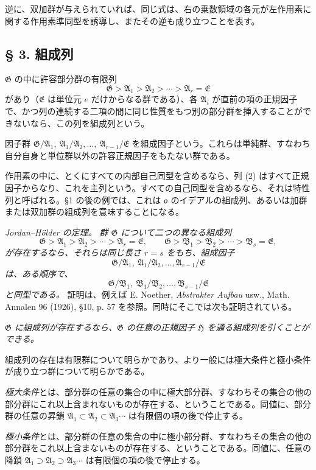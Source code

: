 \documentclass[11pt]{article}
\providecommand{\mG}{\mathfrak{G}}
\providecommand{\mA}{\mathfrak{A}}
\providecommand{\mB}{\mathfrak{B}}
\providecommand{\mE}{\mathfrak{E}}
\providecommand{\mH}{\mathfrak{H}}
\providecommand{\mo}{\mathfrak{o}}
\begin{document}
逆に、双加群が与えられていれば、同じ式は、右の乗数領域の各元が左作用素に関する作用素準同型を誘導し、またその逆も成り立つことを表す。

\subsection*{§ 3. 組成列}

$\mG$ の中に許容部分群の有限列
\[
        \mG>\mA_1>\mA_2>\cdots>\mA_r=\mE \tag{2}
\]
があり（$\mE$ は単位元 $e$ だけからなる群である）、各 $\mA_i$ が直前の項の正規因子で、かつ列の連続する二項の間に同じ性質をもつ別の部分群を挿入することができないなら、この列を組成列という。

因子群 $\mG/\mA_1,\ \mA_1/\mA_2,\ldots,\ \mA_{r-1}/\mE$ を組成因子という。これらは単純群、すなわち自分自身と単位群以外の許容正規因子をもたない群である。

作用素の中に、とくにすべての内部自己同型を含めるなら、列 (2) はすべて正規因子からなり、これを主列という。すべての自己同型を含めるなら、それは特性列と呼ばれる。§1 の後の例では、これは $\mo$ のイデアルの組成列、あるいは加群または双加群の組成列を意味することになる。

\emph{Jordan--Hölder の定理。} \emph{群 $\mG$ について二つの異なる組成列}
\[
        \mG>\mA_1>\mA_2>\cdots>\mA_r=\mE,
        \qquad
        \mG>\mB_1>\mB_2>\cdots>\mB_s=\mE,
\]
\emph{が存在するなら、それらは同じ長さ $r=s$ をもち、組成因子}
\[
        \mG/\mA_1,\ \mA_1/\mA_2,\ldots,\mA_{r-1}/\mE
\]
\emph{は、ある順序で、}
\[
        \mG/\mB_1,\ \mB_1/\mB_2,\ldots,\mB_{s-1}/\mE
\]
\emph{と同型である。}
証明は、例えば E. Noether, \emph{Abstrakter Aufbau} usw., Math. Annalen 96 (1926), §10, p. 57 を参照。同時にそこでは次も証明されている。

\emph{$\mG$ に組成列が存在するなら、$\mG$ の任意の正規因子 $\mH$ を通る組成列を引くことができる。}

組成列の存在は有限群について明らかであり、より一般には極大条件と極小条件が成り立つ群について明らかである。

\emph{極大条件}とは、部分群の任意の集合の中に極大部分群、すなわちその集合の他の部分群にこれ以上含まれないものが存在する、ということである。同値に、部分群の任意の昇鎖 $\mA_1\subset\mA_2\subset\mA_3\cdots$ は有限個の項の後で停止する。

\emph{極小条件}とは、部分群の任意の集合の中に極小部分群、すなわちその集合の他の部分群をこれ以上含まないものが存在する、ということである。同値に、任意の降鎖 $\mA_1\supset\mA_2\supset\mA_3\cdots$ は有限個の項の後で停止する。
\end{document}
